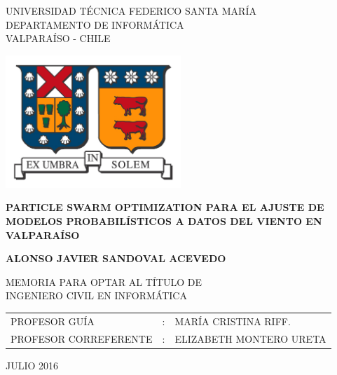 
\begin{center}
  \begin{spacing}{1}
    {\large UNIVERSIDAD TÉCNICA FEDERICO SANTA MARÍA}\\
    DEPARTAMENTO DE INFORMÁTICA\\
    VALPARAÍSO - CHILE
  \end{spacing}

  \vspace{12mm}
  \includegraphics[height=50mm]{figures/usm_logo.png}
  \vspace{15mm}

  \begin{spacing}{1.5} 
    \textbf{\large PARTICLE SWARM OPTIMIZATION PARA EL AJUSTE DE MODELOS
      PROBABILÍSTICOS A DATOS DEL VIENTO EN VALPARAÍSO}\\
  \end{spacing}

  \vspace{20mm}
  \textbf{\large ALONSO JAVIER SANDOVAL ACEVEDO}
  \vspace{12mm}

  \begin{spacing}{1.25} 
    MEMORIA PARA OPTAR AL TÍTULO DE\\
    INGENIERO CIVIL EN INFORMÁTICA
  \end{spacing}

  \vspace{15mm}
  \begin{table}[h]
    \begin{center}
      \begin{tabular}{ l c l }
        PROFESOR GUÍA & : & MARÍA CRISTINA RIFF.\\
        PROFESOR CORREFERENTE & : & ELIZABETH MONTERO URETA\\
      \end{tabular}
    \end{center}
  \end{table}

  \vfill
  \large JULIO 2016
\end{center}
